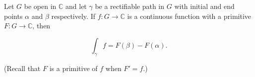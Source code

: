 Let $G$ be open in $\mathbb{C}$ and let $\gamma$ be a rectifiable path in $G$ with initial and end points $\alpha$ and $\beta$ respectively. If $f: G \to \mathbb{C}$ is a continuous function with a primitive $F: G \to \mathbb{C}$, then

$$\int_{\gamma} f = F(\beta) - F(\alpha).$$

(Recall that $F$ is a primitive of $f$ when $F' = f$.)
